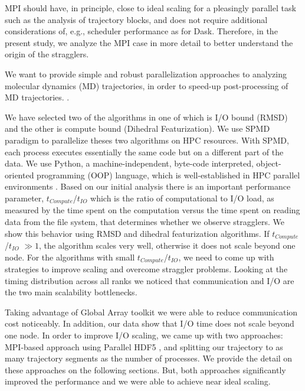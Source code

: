 MPI should have, in principle, close to ideal scaling for a pleasingly parallel task such as the analysis of trajectory blocks, and does not require additional considerations of, e.g., scheduler performance as for Dask. 
Therefore, in the present study, we analyze the MPI case in more detail to better understand the origin of the stragglers.

We want to provide simple and robust parallelization approaches to analyzing molecular dynamics (MD) trajectories, in order to speed-up post-processing of MD trajectories. .

We have selected two of the algorithms in  one of which is I/O bound (RMSD) and the other is compute bound (Dihedral Featurization).
We use SPMD paradigm to parallelize theses two algorithms on HPC resources.
With SPMD, each process executes essentially the same code but on a different part of the data. 
We use Python, a machine-independent, byte-code interpreted, object-oriented programming (OOP) language, which is well-established in HPC parallel environments \cite{GAiN}. 
Based on our initial analysis there is an important performance parameter,  $t_{Compute}$/$t_{IO}$ which is the ratio of computational to I/O load, as measured by the time spent on the computation versus the time spent on reading data from the file system, that determines whether we observe stragglers.
We show this behavior using RMSD and dihedral featurization algorithms.
If $t_{Compute}$/$t_{IO}$  $\gg 1$, the algorithm scales very well, otherwise it does not scale beyond one node. 
For the algorithms with small $t_{Compute}$/$t_{IO}$, we need to come up with strategies to improve scaling and overcome straggler problems.
Looking at the timing distribution across all ranks we noticed that communication and I/O are the two main scalability bottlenecks.

Taking advantage of Global Array toolkit we were able to reduce communication cost noticeably.
In addition, our data show that I/O time does not scale beyond one node. 
In order to improve I/O scaling, we came up with two approaches: MPI-based approach using Parallel HDF5 \cite{pythonhdf5}, and splitting our trajectory to as many trajectory segments as the number of processes. 
We provide the detail on these approaches on the following sections.
But, both approaches significantly improved the performance and we were able to achieve near ideal scaling.
